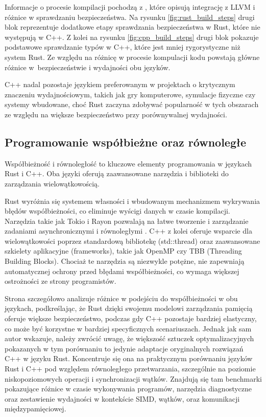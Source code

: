 Informacje o procesie kompilacji pochodzą z \cite{Lesiński, rustPolishNames, TheRustProgrammingLanguage}, które opisują integrację z LLVM i różnice w sprawdzaniu bezpieczeństwa.
Na rysunku \ref{fig:rust_build_steps} drugi blok reprezentuje dodatkowe etapy sprawdzania bezpieczeństwa w Rust, które nie występują w C++. Z kolei na rysunku \ref{fig:cpp_build_steps} drugi blok pokazuje podstawowe sprawdzanie typów w C++, które jest mniej rygorystyczne niż system Rust. Ze względu na różnicę w procesie kompulacji kodu powstają główne różnice w~bezpieczeństwie i wydajności obu języków.

C++ nadal pozostaje językiem preferowanym w projektach o krytycznym znaczeniu wydajnościowym, takich jak gry komputerowe, symulacje fizyczne czy systemy wbudowane, choć Rust zaczyna zdobywać popularność w tych obszarach ze względu na większe bezpieczeństwo przy porównywalnej wydajności. 

\subsection{Programowanie współbieżne oraz równoległe}
\label{Współbieżność}
Współbieżność i równoległość to kluczowe elementy programowania w  językach Rust i C++. Oba języki oferują zaawansowane narzędzia i biblioteki do zarządzania wielowątkowością.

Rust wyróżnia się systemem własności  i wbudowanym mechanizmem wykrywania błędów współbieżności, co eliminuje wyścigi danych w czasie kompilacji. Narzędzia takie jak Tokio i Rayon pozwalają na łatwe tworzenie i zarządzanie zadaniami asynchronicznymi i równoległymi \cite{HandsOnConcurrencywithRust, RapidInnovationMasteringRust}.
C++ z kolei oferuje wsparcie dla wielowątkowości poprzez standardową bibliotekę (std::thread) oraz zaawansowane szkielety aplikacyjne (frameworks), takie jak OpenMP czy TBB (Threading Building Blocks). Chociaż te narzędzia są niezwykle potężne, nie zapewniają automatycznej ochrony przed błędami współbieżności, co wymaga większej ostrożności ze strony programistów.

Strona \cite{parallelrustcppIntroductionComparing} szczegółowo analizuje różnice w podejściu do współbieżności w obu językach, podkreślając, że Rust dzięki swojemu modelowi zarządzania pamięcią oferuje większe bezpieczeństwo, podczas gdy C++ pozostaje bardziej elastyczny, co może być korzystne w bardziej specyficznych scenariuszach. Jednak jak sam autor \cite{parallelrustcppIntroductionComparing} wskazuje, należy zwrócić uwagę, że większość sztuczek optymalizacyjnych pokazanych w tym porównaniu to jedynie adaptacje oryginalnych rozwiązań C++ w języku Rust. Koncentruje się ona na praktycznym porównaniu języków Rust i C++ pod względem równoległego przetwarzania, szczególnie na poziomie niskopoziomowych operacji i synchronizacji wątków. Znajdują się tam benchmarki pokazujące różnice w czasie wykonywania programów, narzędzia diagnostyczne oraz zestawienie wydajności w kontekście SIMD, wątków, oraz komunikacji międzypamięciowej.

